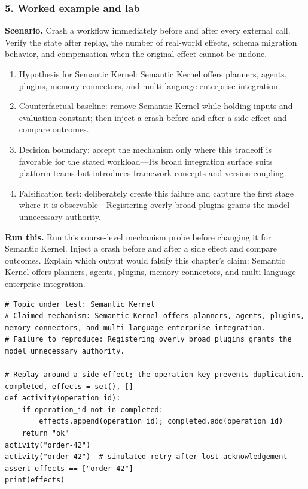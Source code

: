 \subsubsection*{5. Worked example and lab}
\textbf{Scenario.} Crash a workflow immediately before and after every external call. Verify the state after replay, the number of real-world effects, schema migration behavior, and compensation when the original effect cannot be undone.
\begin{enumerate}
\item Hypothesis for Semantic Kernel: Semantic Kernel offers planners, agents, plugins, memory connectors, and multi-language enterprise integration.
\item Counterfactual baseline: remove Semantic Kernel while holding inputs and evaluation constant; then inject a crash before and after a side effect and compare outcomes.
\item Decision boundary: accept the mechanism only where this tradeoff is favorable for the stated workload—Its broad integration surface suits platform teams but introduces framework concepts and version coupling.
\item Falsification test: deliberately create this failure and capture the first stage where it is observable—Registering overly broad plugins grants the model unnecessary authority.
\end{enumerate}
\textbf{Run this.} Run this course-level mechanism probe before changing it for Semantic Kernel. Inject a crash before and after a side effect and compare outcomes. Explain which output would falsify this chapter's claim: Semantic Kernel offers planners, agents, plugins, memory connectors, and multi-language enterprise integration.
\begin{Verbatim}[fontsize=\scriptsize]
# Topic under test: Semantic Kernel
# Claimed mechanism: Semantic Kernel offers planners, agents, plugins, memory connectors, and multi-language enterprise integration.
# Failure to reproduce: Registering overly broad plugins grants the model unnecessary authority.

# Replay around a side effect; the operation key prevents duplication.
completed, effects = set(), []
def activity(operation_id):
    if operation_id not in completed:
        effects.append(operation_id); completed.add(operation_id)
    return "ok"
activity("order-42")
activity("order-42")  # simulated retry after lost acknowledgement
assert effects == ["order-42"]
print(effects)
\end{Verbatim}

